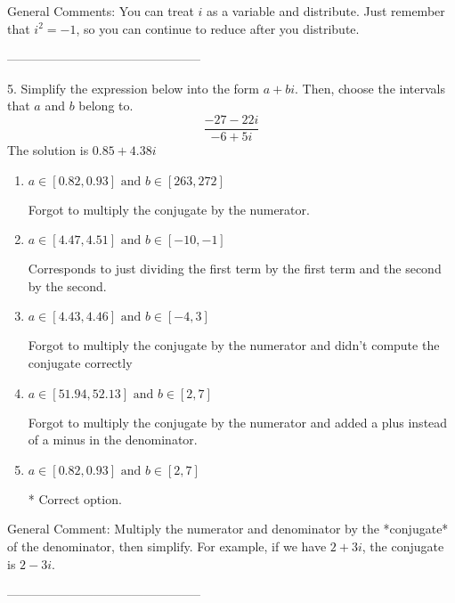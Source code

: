 \documentclass{article}[10pt]
\begin{document}
General Comments: You can treat $i$ as a variable and distribute. Just remember that $i^2=-1$, so you can continue to reduce after you distribute.

-----------------------------------------------

5. Simplify the expression below into the form $a+bi$. Then, choose the intervals that $a$ and $b$ belong to.
$$ \frac{-27-22i}{-6+5i} $$ 
The solution is $ 0.85 + 4.38 i $ 

\begin{enumerate}[label=\Alph*.] 
\item $ a \in [0.82, 0.93] \text{ and } b \in [263, 272] $ 

  Forgot to multiply the conjugate by the numerator. 
\item $ a \in [4.47, 4.51] \text{ and } b \in [-10, -1] $ 

  Corresponds to just dividing the first term by the first term and the second by the second. 
\item $ a \in [4.43, 4.46] \text{ and } b \in [-4, 3] $ 

  Forgot to multiply the conjugate by the numerator and didn't compute the conjugate correctly 
\item $ a \in [51.94, 52.13] \text{ and } b \in [2, 7] $ 

  Forgot to multiply the conjugate by the numerator and added a plus instead of a minus in the denominator. 
\item $ a \in [0.82, 0.93] \text{ and } b \in [2, 7] $ 

 * Correct option. 
\end{enumerate} 
 
General Comment: Multiply the numerator and denominator by the *conjugate* of the denominator, then simplify. For example, if we have $2+3i$, the conjugate is $2-3i$.

-----------------------------------------------
\end{document}
